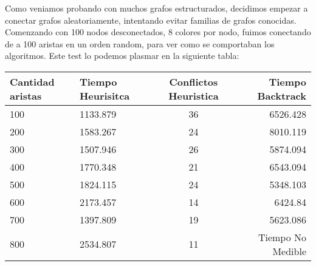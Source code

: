 Como veniamos probando con muchos grafos estructurados, decidimos empezar a conectar grafos aleatoriamente, intentando evitar familias de grafos conocidas.
Comenzando con 100 nodos desconectados, 8 colores por nodo, fuimos conectando de a 100 aristas en un orden random, para ver como se comportaban los algoritmos. Este test lo podemos plasmar en la siguiente tabla:


\begin{tabular}{| l | l | c | r |}
  \hline
Cantidad aristas & Tiempo Heurisitca & Conflictos Heuristica& Tiempo Backtrack \\ \hline
100 &1133.879 & 36 & 6526.428   \\ \hline
200 &1583.267 & 24 & 8010.119   \\ \hline
300 &1507.946 & 26 & 5874.094   \\ \hline
400 &1770.348 & 21 & 6543.094   \\ \hline
500 &1824.115 & 24 & 5348.103   \\ \hline
600 &2173.457 & 14 & 6424.84   \\ \hline
700 &1397.809 & 19 & 5623.086  \\ \hline
800 &2534.807 & 11 & Tiempo No Medible   \\ \hline
\end{tabular}

\pagebreak